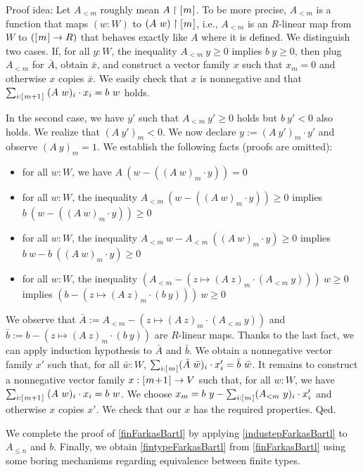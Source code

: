 \documentclass[]{article}
\renewcommand{\.}{\hskip .75pt}
\newcommand{\fin}[1]{[\.#1\.]}
\let\r=\rightarrow
\begin{document}
\medskip \noindent
Proof idea:
Let $A_{<m}$ roughly mean $A \restriction \fin{m}$.
To be more precise, $A_{<m}$ is a function that maps $(w : W)$ to
$(A~w) \restriction \fin{m}$, i.e., $A_{<m}$ is an $R$-linear map
from $W$ to $(\fin{m} \r R)$ that behaves exactly like $A$ where
it is defined.
We distinguish two cases. If, for all $y : W$, the inequality
$A_{<m}~y \ge 0$ implies $b~y \ge 0$, then plug $A_{<m}$
for $\bar{A}$, obtain $\bar{x}$, and construct a vector family $x$ such that
$x_m = 0$ and otherwise $x$ copies $\bar{x}$. We easily check that
$x$ is nonnegative and that
$ \sum_{i : \fin{m+1}}\; (A~w)_i \cdot x_i = b~w $ holds.

In the second case, we have $y'$ such that $A_{<m}~y' \ge 0$
holds but $b~y' < 0$ also holds. We realize that $(A~y')_m < 0$.
We now declare $y := (A~y')_m \cdot y'$ and observe
$(A~y)_m = 1$. We establish the following facts (proofs are omitted):
\begin{itemize}
\item for all $w : W$, we have $A~(w - ((A~w)_m \cdot y)) = 0$
\item for all $w : W$, the inequality $A_{<m}~(w - ((A~w)_m \cdot y)) \ge 0$
implies $b~(w - ((A~w)_m \cdot y)) \ge 0$
\item for all $w : W$, the inequality $A_{<m}~w - A_{<m}~((A~w)_m \cdot y) \ge 0$
implies $b~w - b~((A~w)_m \cdot y) \ge 0$
\item for all $w : W$, the inequality $(A_{<m} - (z \mapsto (A~z)_m \cdot (A_{<m}~y)))~w \ge 0$
implies $(b - (z \mapsto (A~z)_m \cdot (b~y)))~w \ge 0$
\end{itemize}
We observe that
$\bar{A} := A_{<m} - (z \mapsto (A~z)_m \cdot (A_{<m}~y))$
and
$\bar{b} := b - (z \mapsto (A~z)_m \cdot (b~y))$
are $R$-linear maps.
Thanks to the last fact, we can apply induction hypothesis to $\bar{A}$ and $\bar{b}$.
We obtain a nonnegative vector family $x'$ such that,
for all $\bar{w} : W$, $ \sum_{i : \fin{m}} (\bar{A}~\bar{w})_i \cdot x'_i = \bar{b}~\bar{w} $.
It remains to construct a nonnegative vector family $x : \fin{m\!+\!1} \r V$
such that, for all $w : W$, we have
$ \sum_{i : \fin{m+1}}\; (A~w)_i \cdot x_i = b~w $.
We choose $x_m = b~y - \sum_{i : \fin{m}} (A_{<m}~y)_i \cdot x'_i$
and otherwise $x$ copies $x'$. We check that our $x$ has the required
properties. Qed.

\medskip
We complete the proof of \ref{finFarkasBartl} by applying \ref{industepFarkasBartl}
to $A_{\le n}$ and $b$. Finally, we obtain \ref{fintypeFarkasBartl} from
\ref{finFarkasBartl} using some boring mechanisms regarding equivalence between
finite types.
\end{document}

